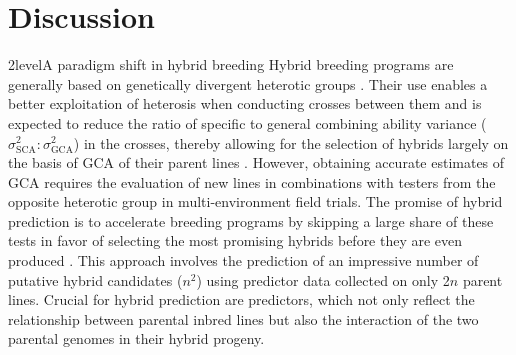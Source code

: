 \documentclass[12pt,titlepage]{article}
\begin{document}
\section*{Discussion}
\Genetics2level{A paradigm shift in hybrid breeding}
Hybrid breeding programs are generally based on genetically divergent heterotic 
groups \cite{Bernardo2010}.
Their use enables a better exploitation of heterosis when conducting crosses 
between them \cite{Melchinger1998} and is expected to reduce the ratio of 
specific to general combining ability variance 
($\sigma^{2}_{\text{SCA}} : \sigma^{2}_{\text{GCA}}$) in the crosses, thereby 
allowing for the selection of hybrids largely on the basis of GCA of their 
parent lines \cite{Reif2007}.
However, obtaining accurate estimates of GCA requires the evaluation of 
new lines in combinations with testers from the opposite heterotic group in
multi-environment field trials.
The promise of hybrid prediction is to accelerate breeding programs by skipping 
a large share of these tests in favor of selecting the most promising hybrids
before they are even produced \cite{Technow2014}.
This approach involves the prediction of an impressive number of putative hybrid 
candidates ($n^{2}$) using predictor data collected on only 2$n$ parent lines.
Crucial for hybrid prediction are predictors, which not only reflect the 
relationship between parental inbred lines but also the interaction of the two 
parental genomes in their hybrid progeny.
\end{document}
